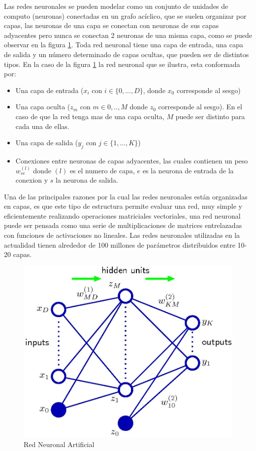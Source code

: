 \documentclass[a4paper,11pt,spanish]{book}
\begin{document}
	Las redes neuronales se pueden modelar como un conjunto de unidades de computo (neuronas) conectadas en un grafo acíclico, que se suelen organizar por capas, las neuronas de una capa
	se conectan con neuronas de sus capas adyacentes pero nunca se conectan 2 neuronas de una misma capa, como se puede observar en la figura \ref{fig:neural_network}.
	Toda red neuronal tiene una capa de entrada, una capa de salida y un número determinado de capas ocultas, que pueden ser de distintos tipos. En la caso de la figura \ref{fig:neural_network}
	la red neuronal que se ilustra, esta conformada por:
	\begin{itemize}
	 \item Una capa de entrada ($x_i$ con $i \in \{0,...,D\}$, donde $x_0$ corresponde al sesgo)
	 \item Una capa oculta ($z_m$ con $m \in {0,..,M}$ donde $z_0$ corresponde al sesgo). En el caso de que la red tenga mas de una capa oculta, $M$ puede ser distinto para cada una de ellas.
	 \item Una capa de salida ($y_j$ con $j \in \{1,...,K\}$)
	 \item Conexiones entre neuronas de capas adyacentes, las cuales contienen un peso $w^{(l)}_{se}$ donde $(l)$ es el numero de capa, $e$ es la neurona de entrada de la conexion y
	 $s$ la neurona de salida.
	\end{itemize}

	Una de las principales razones por la cual las redes neuronales están organizadas en capas, es que este tipo de estructura permite evaluar una red, muy simple y eficientemente realizando
	operaciones matriciales vectoriales, una red neuronal puede ser pensada como una serie de multiplicaciones de matrices entrelazadas con funciones de activaciones no lineales.
	Las redes neuronales utilizadas en la actualidad tienen alrededor de 100 millones de parámetros distribuidos entre 10-20 capas.

	\begin{figure}[ht]
	  \begin{center}
	    \includegraphics[width=0.8\linewidth]{./img/bishop_neural_network.jpg}
	  \end{center}
	  \caption{Red Neuronal Artificial}
	  \label{fig:neural_network}
	\end{figure}
\end{document}
